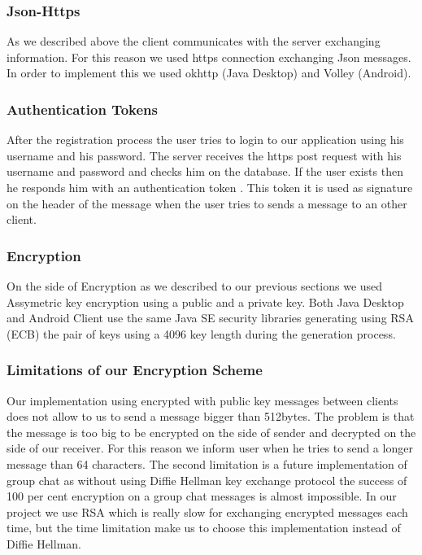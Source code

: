 \documentclass[11pt,a4paper]{report}
\begin{document}
\subsubsection{Json-Https}
As we described above the client communicates with the server exchanging information. For this reason we used https connection exchanging Json messages. In order to implement this we used okhttp (Java Desktop) and Volley (Android).
\subsubsection{Authentication Tokens}
After the registration process the user tries to login to our application using his username and his password. The server receives the https post request with his username and password and checks him on the database. If the user exists then he responds him with an authentication token .  This token it is used as signature on the header of the message when the user tries to sends a message to an other client.
\subsubsection{Encryption}
On the side of Encryption as we described to our previous sections we used Assymetric key encryption using a public and a private key. Both Java Desktop and Android Client use the same Java SE security libraries generating using RSA (ECB) the pair of keys using a 4096 key length during the generation process.
\subsubsection{Limitations of our Encryption Scheme}
Our implementation using encrypted with public key messages between clients does not allow to us to send a message bigger than 512bytes. The problem is that the message is too big to be encrypted on the side of sender and decrypted on the side of our receiver. For this reason we inform user when he tries to send a longer message than 64 characters. The second limitation is a future implementation of group chat as without using  Diffie Hellman key exchange protocol the success of 100 per cent encryption on a group chat messages is almost impossible. In our project we use RSA which is really slow for exchanging encrypted messages each time, but the time limitation make us to choose this implementation instead of Diffie Hellman.
\end{document}

